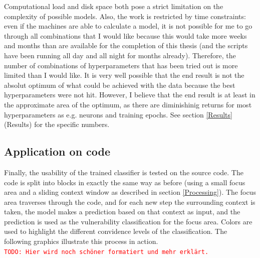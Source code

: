 \documentclass[
	a4paper,
	pagesize,
	pdftex,
	12pt,
	twoside, %
	BCOR=5mm, %
	ngerman,
	fleqn,
	final,
	]{scrartcl}
\begin{document}
Computational load and disk space both pose a strict limitation on the complexity of possible models. Also, the work is restricted by time constraints: even if the machines are able to calculate a model, it is not possible for me to go through all combinations that I would like because this would take more weeks and months than are available for the completion of this thesis (and the scripts have been running all day and all night for months already). Therefore, the number of combinations of hyperparameters that has been tried out is more limited than I would like. It is very well possible that the end result is not the absolut optimum of what could be achieved with the data because the best hyperparameters were not hit. However, I believe that the end result is at least in the approximate area of the optimum, as there are diminishinig returns for most hyperparameters as e.g. neurons and training epochs. See section \ref{Results} (Results) for the specific numbers. 

\subsection{Application on code}
Finally, the usability of the trained classifier is tested on the source code. The code is split into blocks in exactly the same way as before (using a small focus area and a sliding context window as described in section \ref{Processing}). The focus area traverses through the code, and for each new step the surrounding context is taken, the model makes a prediction based on that context as input, and the prediction is used as the vulnerability classification for the focus area. Colors are used to highlight the different convidence levels of the classification. The following graphics illustrate this process in action. \\

\textcolor{red}{\texttt{TODO: Hier wird noch schöner formatiert und mehr erklärt.}}
\end{document}
